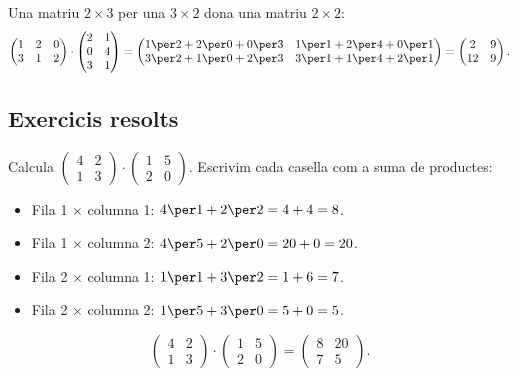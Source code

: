 \begin{exemple}
Una matriu $2\times 3$ per una $3\times 2$ dona una matriu $2\times 2$:
\[
\begin{pmatrix} 1 & 2 & 0 \\ 3 & 1 & 2 \end{pmatrix}\cdot\begin{pmatrix} 2 & 1 \\ 0 & 4 \\ 3 & 1 \end{pmatrix}
=\begin{pmatrix} 1\per 2+2\per 0+0\per 3 & 1\per 1+2\per 4+0\per 1 \\ 3\per 2+1\per 0+2\per 3 & 3\per 1+1\per 4+2\per 1 \end{pmatrix}
=\begin{pmatrix} 2 & 9 \\ 12 & 9 \end{pmatrix}.
\]
\end{exemple}

\subsection{Exercicis resolts}

\begin{exresolt}
Calcula $\begin{pmatrix} 4 & 2 \\ 1 & 3 \end{pmatrix}\cdot\begin{pmatrix} 1 & 5 \\ 2 & 0 \end{pmatrix}$.
\solucio
Escrivim cada casella com a suma de productes:
\begin{itemize}[leftmargin=1.4em, itemsep=2pt]
  \item Fila 1 $\times$ columna 1: $4\per 1+2\per 2=4+4=8$.
  \item Fila 1 $\times$ columna 2: $4\per 5+2\per 0=20+0=20$.
  \item Fila 2 $\times$ columna 1: $1\per 1+3\per 2=1+6=7$.
  \item Fila 2 $\times$ columna 2: $1\per 5+3\per 0=5+0=5$.
\end{itemize}
\[
\begin{pmatrix} 4 & 2 \\ 1 & 3 \end{pmatrix}\cdot\begin{pmatrix} 1 & 5 \\ 2 & 0 \end{pmatrix}=\begin{pmatrix} 8 & 20 \\ 7 & 5 \end{pmatrix}.
\]
\end{exresolt}

